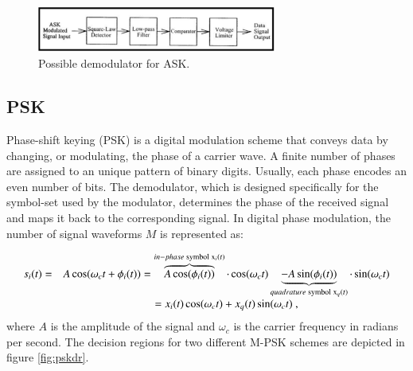\documentclass[12pt,a4paper,openright]{report}
\begin{document}
\begin{figure}[h]
  \centering
    \includegraphics[width=0.7\textwidth]{askdem.pdf}
    \caption[Possible demodulator for ASK]{Possible demodulator for ASK\cite{ASKDemGaza}.}
    \label{fig:askdem}
\end{figure}


\subsection{PSK}

Phase-shift keying (PSK) is a digital modulation scheme that conveys data by changing, or modulating, the phase of a carrier wave. A finite number of phases are assigned to an unique pattern of binary digits. Usually, each phase encodes an even number of bits. The demodulator, which is designed specifically for the symbol-set used by the modulator, determines the phase of the received signal and maps it back to the corresponding signal. In digital phase modulation, the number of signal waveforms $M$ is represented as: 

\begin{equation}\label{Eq:PSK symbol}
\begin{array}{*{20}{c}}
{{s_i}(t) = }&{A\cos ({\omega _c}t + {\phi _i}(t)) = \overbrace {A\cos ({\phi _i}(t))}^{in - phase\;{\rm{symbol}}\;{{\rm{x}}_i}(t)} \cdot \cos ({\omega _c}t) \underbrace {-A\sin ({\phi _i}(t))}_{quadrature\;{\rm{symbol}}\;{{\rm{x}}_q}(t)} \cdot \sin ({\omega _c}t)}\\
{}&{ = {x_i}(t)\cos ({\omega _c}t) + {x_q}(t)\sin ({\omega _c}t)} \ ,
\end{array}
\end{equation}
where $A$ is the amplitude of the signal and ${\omega _c}$ is the carrier frequency in radians per second. The decision regions for two different M-PSK schemes are depicted in figure \ref{fig:pskdr}.
\end{document}
